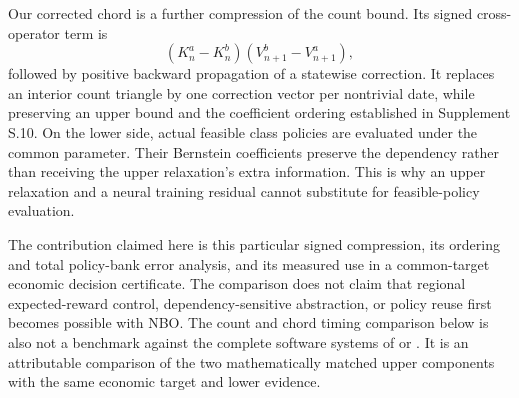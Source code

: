 Our corrected chord is a further compression of the count bound. Its signed cross-operator term is
\begin{equation}
 (K_n^a-K_n^b)(V_{n+1}^b-V_{n+1}^a),
 \label{eq:r8_signed_compression}
\end{equation}
followed by positive backward propagation of a statewise correction. It replaces an interior count triangle by one correction vector per nontrivial date, while preserving an upper bound and the coefficient ordering established in Supplement S.10. On the lower side, actual feasible class policies are evaluated under the common parameter. Their Bernstein coefficients preserve the dependency rather than receiving the upper relaxation's extra information. This is why an upper relaxation and a neural training residual cannot substitute for feasible-policy evaluation.

The contribution claimed here is this particular signed compression, its ordering and total policy-bank error analysis, and its measured use in a common-target economic decision certificate. The comparison does not claim that regional expected-reward control, dependency-sensitive abstraction, or policy reuse first becomes possible with NBO. The count and chord timing comparison below is also not a benchmark against the complete software systems of \citet{quatmann2016} or \citet{heck2025}. It is an attributable comparison of the two mathematically matched upper components with the same economic target and lower evidence.
